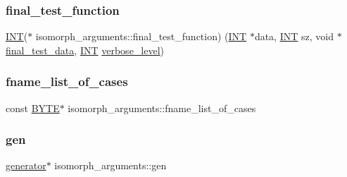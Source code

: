 \subsubsection{\texorpdfstring{final\+\_\+test\+\_\+function}{final\_test\_function}}
{\footnotesize\ttfamily \mbox{\hyperlink{galois_8h_a09fddde158a3a20bd2dcadb609de11dc}{I\+NT}}($\ast$ isomorph\+\_\+arguments\+::final\+\_\+test\+\_\+function) (\mbox{\hyperlink{galois_8h_a09fddde158a3a20bd2dcadb609de11dc}{I\+NT}} $\ast$data, \mbox{\hyperlink{galois_8h_a09fddde158a3a20bd2dcadb609de11dc}{I\+NT}} sz, void $\ast$\mbox{\hyperlink{classisomorph__arguments_a2c4c1f9159141167a769c9df0fcb1ff1}{final\+\_\+test\+\_\+data}}, \mbox{\hyperlink{galois_8h_a09fddde158a3a20bd2dcadb609de11dc}{I\+NT}} \mbox{\hyperlink{simeon_8_c_a818073fbcc2f439e7c56952f67386122}{verbose\+\_\+level}})}

\mbox{\label{classisomorph__arguments_a44171bd1e55f71e42d77592c6b9a8252}} 
\subsubsection{\texorpdfstring{fname\+\_\+list\+\_\+of\+\_\+cases}{fname\_list\_of\_cases}}
{\footnotesize\ttfamily const \mbox{\hyperlink{galois_8h_ab6cc7b4aeb6ea31aba2b3fbfc83ff5e6}{B\+Y\+TE}}$\ast$ isomorph\+\_\+arguments\+::fname\+\_\+list\+\_\+of\+\_\+cases}

\mbox{\label{classisomorph__arguments_a3d279de859c51e6c2868b2f624f93e8b}} 
\subsubsection{\texorpdfstring{gen}{gen}}
{\footnotesize\ttfamily \mbox{\hyperlink{classgenerator}{generator}}$\ast$ isomorph\+\_\+arguments\+::gen}

\mbox{\label{classisomorph__arguments_ad49f18bb9504f56452288eadecdb0564}} 
